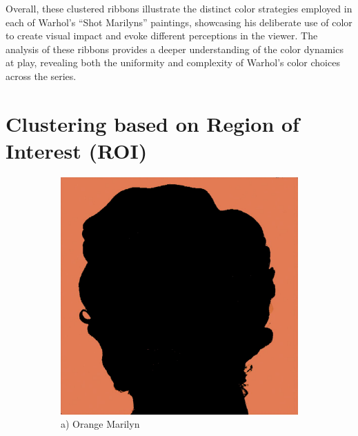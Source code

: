 \documentclass{article}
\begin{document}
Overall, these clustered ribbons illustrate the distinct color
strategies employed in each of Warhol's ``Shot Marilyns'' paintings,
showcasing his deliberate use of color to create visual impact and evoke
different perceptions in the viewer. The analysis of these ribbons
provides a deeper understanding of the color dynamics at play, revealing
both the uniformity and complexity of Warhol's color choices across the
series.

\hypertarget{clustering-based-on-region-of-interest-roi}{%
\section{Clustering based on Region of Interest
(ROI)}\label{clustering-based-on-region-of-interest-roi}}

\begin{figure}[htbp]
    \centering
    \begin{subfigure}[b]{0.19\textwidth}
        \includegraphics[width=\textwidth]{main_files/figure-latex/8_1_orange_marilyn_background_extraction.jpg}
        \caption*{a) Orange Marilyn}
    \end{subfigure}
    \hfill
    \begin{subfigure}[b]{0.19\textwidth}

\end{subfigure}
\end{figure}
\end{document}
